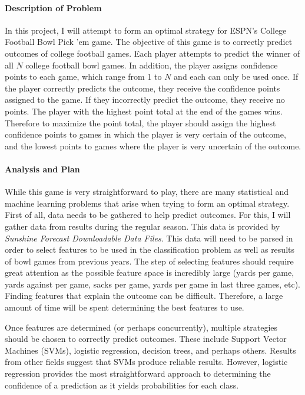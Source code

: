 \documentclass[12pt]{report}
\begin{document}
	

\maketitle
	
\paragraph{Description of Problem}
In this project, I will attempt to form an optimal strategy for ESPN's College Football Bowl Pick 'em game. The objective of this game is to correctly predict outcomes of college football games. Each player attempts to predict the winner of all $N$ college football bowl games. In addition, the player assigns confidence points to each game, which range from 1 to $N$ and each can only be used once. If the player correctly predicts the outcome, they receive the confidence points assigned to the game. If they incorrectly predict the outcome, they receive no points. The player with the highest point total at the end of the games wins. Therefore to maximize the point total, the player should assign the highest confidence points to games in which the player is very certain of the outcome, and the lowest points to games where the player is very uncertain of the outcome.

\paragraph{Analysis and Plan}
While this game is very straightforward to play, there are many statistical and machine learning problems that arise when trying to form an optimal strategy. First of all, data needs to be gathered to help predict outcomes. For this, I will gather data from results during the regular season. This data is provided by \textit{Sunshine Forecast Downloadable Data Files}. This data will need to be parsed in order to select features to be used in the classification problem as well as results of bowl games from previous years. The step of selecting features should require great attention as the possible feature space is incredibly large (yards per game, yards against per game, sacks per game, yards per game in last three games, etc). Finding features that explain the outcome can be difficult. Therefore, a large amount of time will be spent determining the best features to use.

Once features are determined (or perhaps concurrently), multiple strategies should be chosen to correctly predict outcomes. These include Support Vector Machines (SVMs), logistic regression, decision trees, and perhaps others. Results from other fields suggest that SVMs produce reliable results. However, logistic regression provides the most straightforward approach to determining the confidence of a prediction as it yields probabilities for each class.
\end{document}
